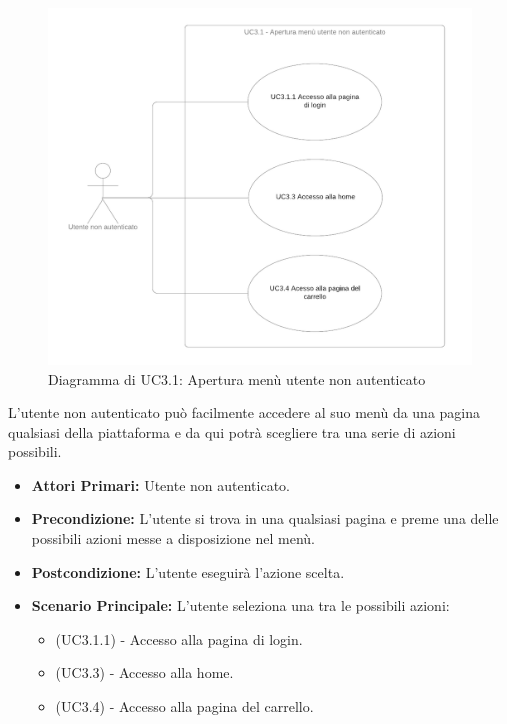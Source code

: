 \begin{figure}[H]
    \centering
    \includegraphics[scale=0.3]{Immagini/DiagrammiUC/UC3.1MenuUtenteNonAutenticato.png}
    \caption{Diagramma di UC3.1: Apertura menù utente non autenticato} 
    \label{fig:MenuUtenteNonAutenticato}
\end{figure}

L'utente non autenticato può facilmente accedere al suo menù da una pagina qualsiasi della piattaforma e da qui potrà scegliere tra una serie di azioni possibili.
\begin{itemize}
    \item \textbf{Attori Primari:} Utente non autenticato.
    \item \textbf{Precondizione:} L'utente si trova in una qualsiasi pagina e preme una delle possibili azioni messe a disposizione nel menù.
    \item \textbf{Postcondizione:} L'utente eseguirà l'azione scelta.
    \item \textbf{Scenario Principale:} L'utente seleziona una tra le possibili azioni:
    \begin{itemize}
        \item (UC3.1.1) - Accesso alla pagina di login.
        \item (UC3.3) - Accesso alla home.
        \item (UC3.4) - Accesso alla pagina del carrello.
    \end{itemize}
\end{itemize}

